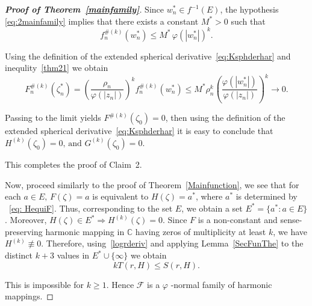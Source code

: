 \documentclass[11pt, reqno]{amsart}
\numberwithin{equation}{section}
\theoremstyle{definition}
\theoremstyle{remark}
\theoremstyle{plain}
\begin{document}
\begin{proof}[\bf{Proof of Theorem~\ref{mainfamily}}]
Since $w_n^*\in f^{-1}(E)$, the hypothesis \eqref{eq:2mainfamily}
 implies that there exists
a constant $M^*>0$ such that
\begin{equation}\label{thm21}
f_n^{\#(k)}(w_n^*)
\leq
M^*\,\varphi(|w_n^*|)^k.
\end{equation}

Using the definition of the extended spherical
 derivative~\eqref{eq:Ksphderhar} and inequlity~\eqref{thm21} we obtain
\[
F_n^{\#(k)}(\zeta_n^*)
=
\left(\frac{\rho_n}{\varphi(|z_n|)}\right)^k
f_n^{\#(k)}(w_n^*)\leq
M^*\rho_n^k
\left(
\frac{\varphi(|w_n^*|)}
{\varphi(|z_n|)}
\right)^k\longrightarrow0.
\]

Passing to the limit yields
$
F^{\#(k)}(\zeta_0)=0
$, then using the definition of the extended spherical 
derivative~\eqref{eq:Ksphderhar}
it is easy to conclude that
$
H^{(k)}(\zeta_0)=0,\,
\text{and}\,\,
G^{(k)}(\zeta_0)=0.$\smallskip

This completes the proof of Claim~2.\smallskip
 
Now, proceed similarly to the proof of 
Theorem~\ref{Mainfunction}, we see that 
for each $a\in E, \, F(\zeta)=a$ is equivalent to $H(\zeta)=a^*$,
where $a^*$
 is determined by ~\eqref{eq: HequiF}.
Thus, corresponding to the set $E$, we obtain a set $E^*=\{a^*: a\in E\}$.
Moreover, $H(\zeta)\in E^*\Longrightarrow H^{(k)}(\zeta)=0$.
 Since $F$ is a non-constant and sense-preserving harmonic 
 mapping in $\mathbb{C}$
having zeros of multiplicity at least $k$, we have $H^{(k)}\not\equiv 0$.
Therefore, using~\eqref{logrderiv} and applying Lemma~\ref{SecFunThe}
 to the distinct $k+3$ values in $E^*\cup \{\infty\}$ we obtain
\[
    kT(r,H) \leq S(r,H).
\] 

This is impossible for $k\geq1$. Hence $\mathcal{F}$ is a $\varphi$
  -normal family of harmonic mappings.
\end{proof}
\medskip
\end{document}
